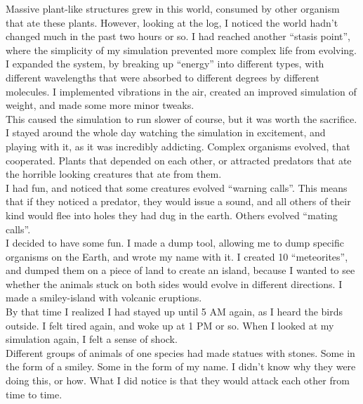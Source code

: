 \documentclass[a5paper]{scrartcl}
\begin{document}
Massive plant-like structures grew in this world, consumed by other organism that ate these plants. However, looking at the log, I noticed the world hadn't changed much in the past two hours or so. I had reached another \enquote{stasis point}, where the simplicity of my simulation prevented more complex life from evolving.\\


I expanded the system, by breaking up \enquote{energy} into different types, with different wavelengths that were absorbed to different degrees by different molecules. I implemented vibrations in the air, created an improved simulation of weight, and made some more minor tweaks.\\


This caused the simulation to run slower of course, but it was worth the sacrifice. I stayed around the whole day watching the simulation in excitement, and playing with it, as it was incredibly addicting. Complex organisms evolved, that cooperated. Plants that depended on each other, or attracted predators that ate the horrible looking creatures that ate from them.\\


I had fun, and noticed that some creatures evolved \enquote{warning calls}. This means that if they noticed a predator, they would issue a sound, and all others of their kind would flee into holes they had dug in the earth. Others evolved \enquote{mating calls}.\\


I decided to have some fun. I made a dump tool, allowing me to dump specific organisms on the Earth, and wrote my name with it. I created 10 \enquote{meteorites}, and dumped them on a piece of land to create an island, because I wanted to see whether the animals stuck on both sides would evolve in different directions. I made a smiley-island with volcanic eruptions.\\


By that time I realized I had stayed up until 5 AM again, as I heard the birds outside. I felt tired again, and woke up at 1 PM or so. When I looked at my simulation again, I felt a sense of shock.\\


Different groups of animals of one species had made statues with stones. Some in the form of a smiley. Some in the form of my name. I didn't know why they were doing this, or how. What I did notice is that they would attack each other from time to time.\\
\end{document}
